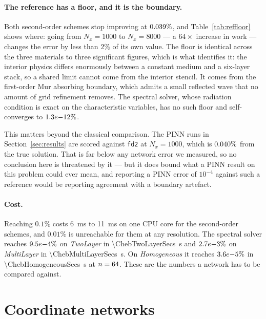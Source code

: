 \paragraph{The reference has a floor, and it is the boundary.}
Both second-order schemes stop improving at $0.039\%$, and Table~\ref{tab:reffloor}
shows where: going from $N_x = 1000$ to $N_x = 8000$ --- a $64\times$ increase in
work --- changes the error by less than $2\%$ of its own value. The floor is
identical across the three materials to three significant figures, which is
what identifies it: the interior physics differs enormously between a constant
medium and a six-layer stack, so a shared limit cannot come from the interior
stencil. It comes from the first-order Mur absorbing boundary, which admits a
small reflected wave that no amount of grid refinement removes. The spectral
solver, whose radiation condition is exact on the characteristic variables, has
no such floor and self-converges to $1.3e{-}12\%$.



This matters beyond the classical comparison. The PINN runs in
Section~\ref{sec:results} are scored against \texttt{fd2} at $N_x = 1000$,
which is $0.040\%$ from the true solution. That is far below any network
error we measured, so no conclusion here is threatened by it --- but it does
bound what a PINN result on this problem could ever mean, and reporting a PINN
error of $10^{-4}$ against such a reference would be reporting agreement with a
boundary artefact.

\paragraph{Cost.} Reaching $0.1\%$ costs \SI{6}{\milli\second} to
\SI{11}{\milli\second} on one CPU core for the second-order schemes, and
$0.01\%$ is unreachable for them at any resolution. The spectral solver reaches
$9.5e{-}4\%$ on \emph{TwoLayer} in \SI{\ChebTwoLayerSecs}{\second} and
$2.7e{-}3\%$ on \emph{MultiLayer} in
\SI{\ChebMultiLayerSecs}{\second}. On \emph{Homogeneous} it reaches
$3.6e{-}5\%$ in \SI{\ChebHomogeneousSecs}{\second} at $n = 64$.
These are the numbers a network has to be compared against.

\section{Coordinate networks}
\label{sec:pinn}


